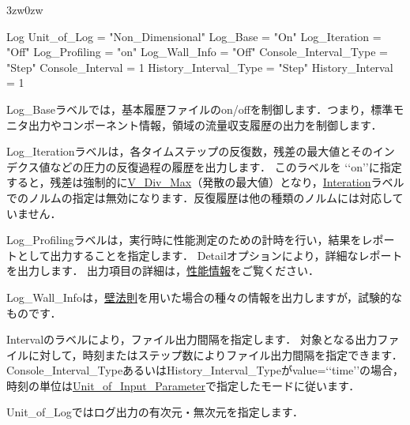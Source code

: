 \begin{indentation}{3zw}{0zw}

{\small
\begin{program}
  Log {
    Unit_of_Log           = "Non_Dimensional"
    Log_Base              = "On"
    Log_Iteration         = "Off"
    Log_Profiling         = "on"
    Log_Wall_Info         = "Off"
    Console_Interval_Type = "Step"
    Console_Interval      = 1
    History_Interval_Type = "Step"
    History_Interval      = 1
  }
\end{program}
}

Log\_Baseラベルでは，基本履歴ファイルのon/offを制御します．つまり，標準モニタ出力やコンポーネント情報，領域の流量収支履歴の出力を制御します．

Log\_Iterationラベルは，各タイムステップの反復数，残差の最大値とそのインデクス値などの圧力の反復過程の履歴を出力します．
このラベルを \lq\lq on\rq\rq に指定すると，残差は強制的に\hyperlink{tgt:iteration}{V\_Div\_Max}（発散の最大値）となり，\hyperlink{tgt:iteration}{Interation}ラベルでのノルムの指定は無効になります．反復履歴は他の種類のノルムには対応していません．

Log\_Profilingラベルは，実行時に性能測定のための計時を行い，結果をレポートとして出力することを指定します．
Detailオプションにより，詳細なレポートを出力します．
出力項目の詳細は，\hyperlink{tgt:profile}{性能情報}をご覧ください．

Log\_Wall\_Infoは，\hyperlink{tgt:treatment_of_wall}{壁法則}を用いた場合の種々の情報を出力しますが，試験的なものです．

Intervalのラベルにより，ファイル出力間隔を指定します．
対象となる出力ファイルに対して，時刻またはステップ数によりファイル出力間隔を指定できます．
Console\_Interval\_TypeあるいはHistory\_Interval\_Typeがvalue=\lq\lq time\rq\rq の場合，時刻の単位は\hyperlink{tgt:unit}{Unit\_of\_Input\_Parameter}で指定したモードに従います．

Unit\_of\_Logではログ出力の有次元・無次元を指定します．


\end{indentation}
